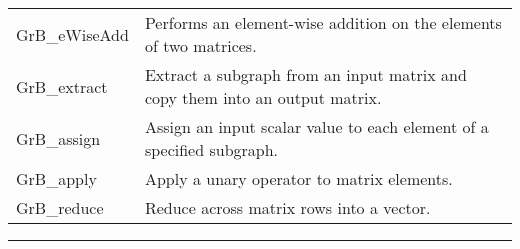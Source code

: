 \begin{table}[h]
\begin{center}
\begin{tabular}{lp{5.25cm}}
	{\sf GrB\_eWiseAdd}         & Performs an element-wise addition on the elements of two matrices.                  \\
	{\sf GrB\_extract}          & Extract a subgraph from an input matrix and copy them into an output matrix.        \\
	{\sf GrB\_assign}           & Assign an input scalar value to each element of a specified subgraph.              \\
	{\sf GrB\_apply}            & Apply a unary operator to matrix elements.                                 \\
	{\sf GrB\_reduce}           & Reduce across matrix rows into a vector.                    \\
\end{tabular}
\end{center}
\hrule
\end{table}


